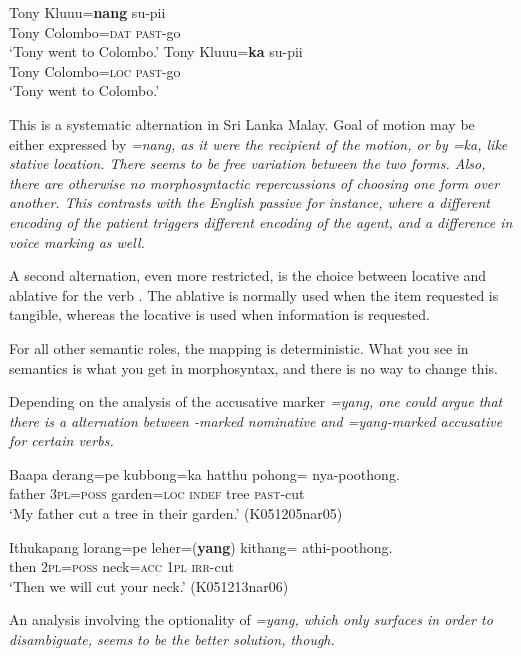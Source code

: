 \documentclass[a4paper,10pt]{article}
\begin{document}
\ea
  \ea
  \gll Tony Kluu\umb{}u=\textbf{nang} su-pii\\
  Tony Colombo=\textsc{dat} \textsc{past}-go\\
  `Tony went to Colombo.'
  \ex
  \gll Tony Kluu\umb{}u=\textbf{ka} su-pii\\ 
  Tony Colombo=\textsc{loc} \textsc{past}-go\\
  `Tony went to Colombo.'
  \z
\z



This is a systematic alternation in Sri Lanka Malay. Goal of motion may be either expressed by \em =nang\em, as it were the recipient of the motion, or by \em =ka\em, like stative location. There seems to be free variation between the two forms. Also, there are otherwise no morphosyntactic repercussions of choosing one form over another. 
This contrasts with the English passive for instance, where a different encoding of the patient triggers different encoding of the agent, and a difference in voice marking as well. 

A second alternation, even more restricted, is the choice between locative and ablative for the verb . The ablative is normally used when the item requested is tangible, whereas the locative is used when information is requested.

For all other semantic roles, the mapping is deterministic. What you see in semantics is what you get in morphosyntax, and there is no way to change this.

Depending on the analysis of the accusative marker \em =yang\em, one could argue that there is a alternation between \zero{}-marked nominative and \em =yang\em-marked accusative for certain verbs. 

\ea 
\gll Baapa   derang=pe     kubbong=ka   hatthu pohong=\zero{} nya-poothong. \\
      father \textsc{3pl}=\textsc{poss} garden=\textsc{loc} \textsc{indef} tree \textsc{past}-cut \\
    `My father cut a tree in their garden.' (K051205nar05)
\z

\ea 
\gll  Ithukapang       lorang=pe     leher=(\textbf{yang})  kithang=\zero{} athi-poothong. \\
      then \textsc{2pl}=\textsc{poss} neck=\textsc{acc} \textsc{1pl} \textsc{irr}-cut \\
    `Then we will cut your neck.' (K051213nar06)
\z

An analysis involving the optionality of \em =yang\em, which only surfaces in order to disambiguate, seems to be the better solution, though. 
\end{document}
